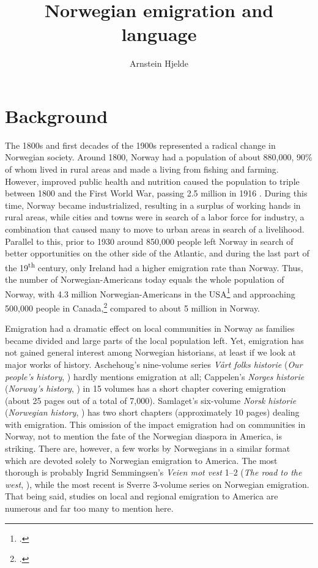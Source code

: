 \documentclass[output=paper]{langscibook}
\author{Arnstein Hjelde\orcid{}\affiliation{Østfold University College}}
\title{Norwegian emigration and language}
\begin{document}
\maketitle 


\section{Background}\label{sec:hjelde:1}

The 1800s and first decades of the 1900s represented a radical change in Norwegian society. Around 1800, Norway had a population of about 880,000, 90\% of whom lived in rural areas and made a living from fishing and farming. However, improved public health and nutrition caused the population to triple between 1800 and the First World War, passing 2.5 million in 1916 \citep{statisticsnorwayApopulation}. During this time, Norway became industrialized, resulting in a surplus of working hands in rural areas, while cities and towns were in search of a labor force for industry, a combination that caused many to move to urban areas in search of a livelihood. Parallel to this, prior to 1930 around 850,000 people left Norway in search of better opportunities on the other side of the Atlantic, and during the last part of the 19\textsuperscript{th} century, only Ireland had a higher emigration rate than Norway. Thus, the number of Norwegian\hyp Americans today equals the whole population of Norway, with 4.3 million Norwegian\hyp Americans in the USA\footnote{\citet{USCensus2020}.} and approaching 500,000 people in Canada,\footnote{\citet{Statcan2016}.} compared to about 5 million in Norway. 

Emigration had a dramatic effect on local communities in Norway as families became divided and large parts of the local population left. Yet, emigration has not gained general interest among Norwegian historians, at least if we look at major works of history. Aschehoug’s nine-volume series \textit{Vårt folks historie} (\textit{Our people’s history}, \citealt{Dahl1961}) hardly mentions emigration at all; Cappelen’s \textit{Norges historie} (\textit{Norway’s history}, \citealt{Mykland1975}) in 15 volumes has a short chapter covering emigration (about 25 pages out of a total of 7,000). Samlaget’s six-volume \textit{Norsk historie} (\textit{Norwegian history}, \citealt{Homlung1999})  has two short chapters (approximately 10 pages) dealing with emigration. This omission of the impact emigration had on communities in Norway, not to mention the fate of the Norwegian diaspora in America, is striking. There are, however, a few works by Norwegians in a similar format which are devoted solely to Norwegian emigration to America. The most thorough is probably Ingrid Semmingsen’s \textit{Veien mot vest} 1--2 (\textit{The road to the west}, \citealt{Semmingsen1941, Semmingsen1950}), while the most recent is Sverre  3-volume series on Norwegian emigration. That being said, studies on local and regional emigration to America are numerous and far too many to mention here. 
\end{document}

